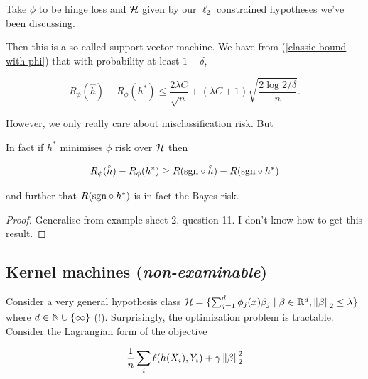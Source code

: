 \documentclass[11pt]{scrartcl}
\begin{document}
\begin{example}
\label{SVM theory}
Take $\phi$ to be hinge loss and $\mathcal{H}$ given by our $\ell_2$ constrained hypotheses we've been discussing.

Then this is a so-called support vector machine. We have from (\ref{classic bound with phi}) that with probability at least $1 - \delta$,

\begin{equation}
    R_\phi(\hat{h}) - R_\phi(h^*) \le \frac{2 \lambda C}{\sqrt{n}} + (\lambda C + 1) \sqrt{\frac{2 \log 2/\delta}{n}}.
\end{equation}
\end{example}

However, we only really care about misclassification risk. But

\begin{theorem}

In fact if $h^*$ minimises $\phi$ risk over $\mathcal{H}$ then

\begin{equation}
    R_\phi(\hat{h}) - R_\phi(h^*) \ge R(\text{sgn} \circ \hat{h}) - R(\text{sgn} \circ h^*)
\end{equation}

and further that $R(\text{sgn} \circ h^*)$ is in fact the Bayes risk.

\begin{proof} %
Generalise from example sheet 2, question 11. I don't know how to get this result. %
\end{proof}
\end{theorem}

\subsection{Kernel machines (\textit{non-examinable})}

Consider a very general hypothesis class $\mathcal{H} = \{ \sum_{j=1}^d \phi_j(x) \beta_j \mid \beta \in \mathbb R^d, \left\lVert\beta\right\rVert_2 \le \lambda \}$ where $d \in \mathbb N \cup \{ \infty \}$ (!). Surprisingly, the optimization problem is tractable. Consider the Lagrangian form of the objective

\begin{equation}
    \frac1n \sum_{i} \ell(h(X_i), Y_i) + \gamma \left\lVert\beta\right\rVert_2^2
\end{equation}
\end{document}
